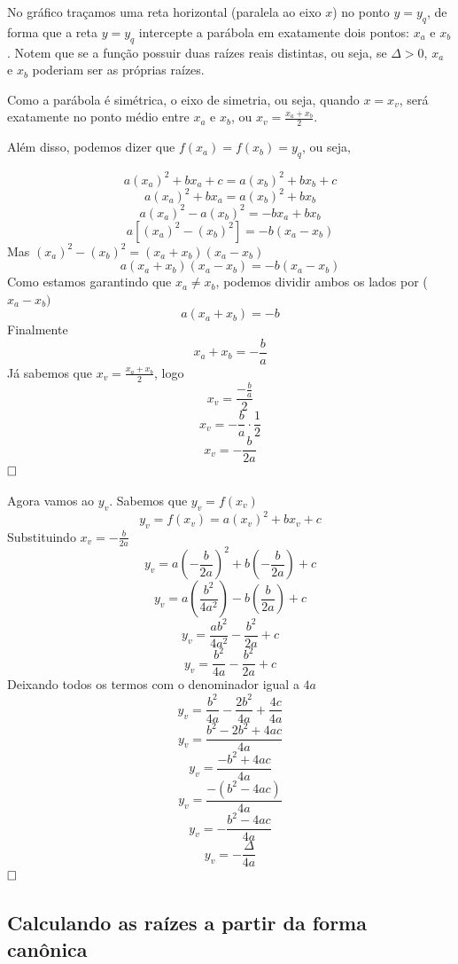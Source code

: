 \documentclass[12pt,a4paper]{report}
\begin{document}
	No gráfico traçamos uma reta horizontal (paralela ao eixo $x$) no ponto $y=y_q$, de forma que a reta $y=y_q$ intercepte a parábola em exatamente dois pontos: $x_a$ e $x_b$. Notem que se a função possuir duas raízes reais distintas, ou seja, se $\Delta >0$, $x_a$ e $x_b$ poderiam ser as próprias raízes.
	
	Como a parábola é simétrica, o eixo de simetria, ou seja, quando $x=x_v$, será exatamente no ponto médio entre $x_a$ e $x_b$, ou $x_v = \frac{x_a + x_b}{2}$.
	
	Além disso, podemos dizer que $f(x_a) = f(x_b) = y_q$, ou seja,
	
	$$a (x_a)^2 + b x_a + c = a (x_b)^2 + b x_b + c$$
	$$a (x_a)^2 + b x_a  = a (x_b)^2 + b x_b $$	
	$$a (x_a)^2 - a (x_b)^2 =-  b x_a+  b x_b $$
	$$a [(x_a)^2 - (x_b)^2] = -b (x_a - x_b) $$
	Mas $(x_a)^2 - (x_b)^2=(x_a+x_b)(x_a-x_b)$
	$$a (x_a+x_b)(x_a-x_b) = -b (x_a - x_b) $$
	Como estamos garantindo que $x_a \neq x_b$, podemos dividir ambos os lados por ($x_a - x_b)$
	$$a (x_a+x_b) = -b $$
	Finalmente
		$$x_a+x_b = -\frac{b}{a} $$
	Já sabemos que $x_v = \frac{x_a + x_b}{2}$, logo
	$$x_v = \frac{-\frac{b}{a}}{2}$$
	$$x_v = -\frac{b}{a} \cdot \frac{1}{2}$$
	$$x_v = -\frac{b}{2a}$$
	$\hfill \square$
	
	Agora vamos ao $y_v$. Sabemos que $y_v=f(x_v)$
	$$ y_v=f(x_v) = a (x_v)^2 + b x_v + c $$
	Substituindo $x_v = -\frac{b}{2a}$
	$$ y_v= a \left( -\frac{b}{2a}\right)^2 + b \left( -\frac{b}{2a}\right)  + c $$
	$$ y_v= a \left( \frac{b^2}{4a^2}\right) - b \left( \frac{b}{2a}\right)  + c $$
	$$ y_v=  \frac{ab^2}{4a^2} - \frac{b^2}{2a}  + c $$
	$$ y_v=  \frac{b^2}{4a} - \frac{b^2}{2a}  + c $$
	Deixando todos os termos com o denominador igual a $4a$
	$$ y_v=  \frac{b^2}{4a} - \frac{2b^2}{4a}  + \frac{4c}{4a} $$
	$$ y_v=  \frac{b^2 - 2b^2 + 4ac}{4a} $$
	$$ y_v=  \frac{-b^2 + 4ac}{4a} $$
	$$ y_v=  \frac{-(b^2 - 4ac)}{4a} $$
	$$ y_v=  -\frac{b^2 - 4ac}{4a} $$
	$$ y_v=  -\frac{\Delta}{4a} $$
	$\hfill \square$
	
	
	\subsection{Calculando as raízes a partir da forma canônica}
	
\end{document}
